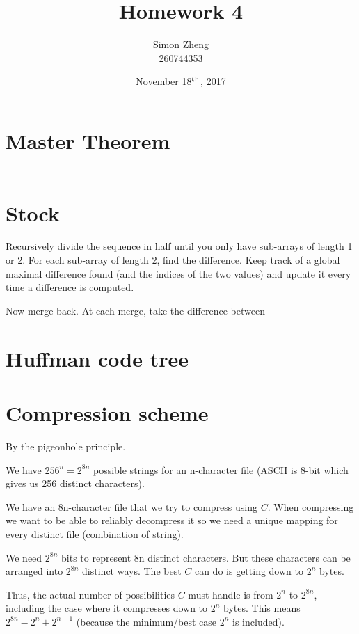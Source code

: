 \documentclass[11pt,letterpaper]{article}
\author{Simon Zheng\\260744353}
\title{Homework 4}
\date{November 18$^{\textnormal{th}}$, 2017}
\begin{document}
	\maketitle
	\thispagestyle{fancy}
	
	\section{Master Theorem}
		\begin{align*}
			\
		\end{align*}
	
	\section{Stock}
		Recursively divide the sequence in half until you only have sub-arrays of length 1 or 2.
		For each sub-array of length 2, find the difference.
		Keep track of a global maximal difference found (and the indices of the two values) and update it every time a difference is computed.
		
		Now merge back.
		At each merge, take the difference between
		
	\section{Huffman code tree}
		
	
	\section{Compression scheme}
		By the pigeonhole principle.
		
		We have $256^n = 2^{8n}$ possible strings for an n-character file (ASCII is 8-bit which gives us 256 distinct characters).
		
		We have an 8n-character file that we try to compress using $C$.
		When compressing we want to be able to reliably decompress it so we need a unique mapping for every distinct file (combination of string).
		
		We need $2^{8n}$ bits to represent 8n distinct characters.
		But these characters can be arranged into $2^{8n}$ distinct ways.
		The best $C$ can do is getting down to $2^n$ bytes.
		
		Thus, the actual number of possibilities $C$ must handle is from $2^n$ to $2^{8n}$, including the case where it compresses down to $2^n$ bytes.
		This means $2^{8n} - 2^n + 2^{n-1}$ (because the minimum/best case $2^n$ is included).
		
\end{document}
